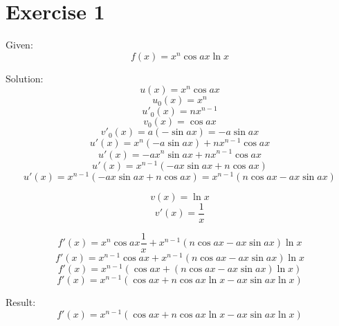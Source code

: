 \documentclass[a4paper, 10pt]{scrartcl}
\begin{document}
\section{Exercise 1}

Given:
\[f(x) = x^{n}\cos{ax}\ln{x}\]

Solution:
\[u(x) = x^{n}\cos{ax}\]
\[u_{0}(x) = x^{n}\]
\[u'_{0}(x) = nx^{n - 1}\]
\[v_{0}(x) = \cos{ax}\]
\[v'_{0}(x) = a(-\sin{ax}) = -a\sin{ax}\]
\[u'(x) = x^{n}(-a\sin{ax}) + nx^{n - 1}\cos{ax}\]
\[u'(x) = -ax^{n}\sin{ax} + nx^{n - 1}\cos{ax}\]
\[u'(x) = x^{n - 1}(-ax\sin{ax} + n\cos{ax})\]
\[u'(x) = x^{n - 1}(-ax\sin{ax} + n\cos{ax}) = x^{n - 1}(n\cos{ax} - ax\sin{ax})\]

\[v(x) = \ln{x}\]
\[v'(x) = \frac{1}{x}\]

\[f'(x) = x^{n}\cos{ax}\frac{1}{x} + x^{n - 1}(n\cos{ax} - ax\sin{ax})\ln{x}\]
\[f'(x) = x^{n - 1}\cos{ax} + x^{n - 1}(n\cos{ax} - ax\sin{ax})\ln{x}\]
\[f'(x) = x^{n - 1}(\cos{ax} + (n\cos{ax} - ax\sin{ax})\ln{x})\]
\[f'(x) = x^{n - 1}(\cos{ax} + n\cos{ax}\ln{x} - ax\sin{ax}\ln{x})\]

Result:
\[f'(x) = x^{n - 1}(\cos{ax} + n\cos{ax}\ln{x} - ax\sin{ax}\ln{x})\]
\end{document}
